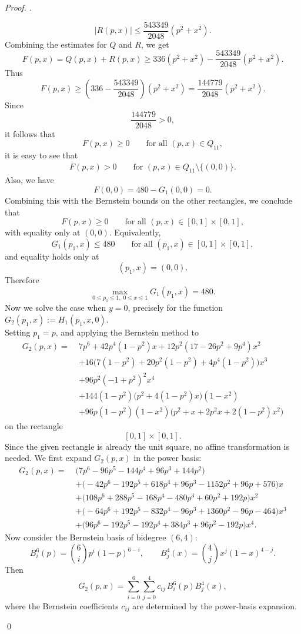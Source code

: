 \documentclass[a4paper,12pt,reqno]{amsart} %
\numberwithin{equation}{section}
\theoremstyle{definition}
\newenvironment{pf}[1][]{%
	\vskip 3mm
	\noindent
	\ifthenelse{\equal{#1}{}}%
	{{\slshape Proof. }}%
	{{\slshape #1.} }%
}%
{\qed\bigskip}
\begin{document}
\begin{pf}
\[
|R(p,x)|\le \frac{543349}{2048}(p^2+x^2).
\]
Combining the estimates for $Q$ and $R$, we get
\[
F(p,x)=Q(p,x)+R(p,x)
\ge 336(p^2+x^2)-\frac{543349}{2048}(p^2+x^2).
\]
Thus
\[
F(p,x)\ge
\left(336-\frac{543349}{2048}\right)(p^2+x^2)
=
\frac{144779}{2048}(p^2+x^2).
\]
Since
\[
\frac{144779}{2048}>0,
\]
it follows that
\[
F(p,x)\ge 0
\qquad \text{for all }(p,x)\in Q_{11},
\]
it is easy to see that
\begin{align*}
F(p,x)>0
\qquad \text{for }(p,x)\in Q_{11}\setminus\{(0,0)\}.
\end{align*}
Also, we have
\[
F(0,0)=480-G_1(0,0)=0.
\]
Combining this with the Bernstein bounds on the other rectangles, we conclude that
\[
F(p,x)\ge 0
\qquad \text{for all }(p,x)\in[0, 1]\times[0, 1],
\]
with equality only at \((0,0)\).
Equivalently,
\[
G_1(p_1,x)\le 480
\qquad \text{for all }(p_1,x)\in[0, 1]\times[0, 1],
\]
and equality holds only at
\[
(p_1,x)=(0,0).
\]
Therefore
\[
\max_{0\le p_1\le 1,\;0\le x\le 1}G_1(p_1,x)=480.
\]
Now we solve the case when 
$y=0$, precisely for the function $G_{2}(p_1, x):=H_{1}(p_1, x, 0)$.\\[2mm]
Setting $p_{1}=p$, and applying the Bernstein method to
\[
\begin{aligned}
G_2(p,x)=\;&7 p^6 + 42 p^4 (1-p^2)x + 12 p^2(17-26p^2+9p^4)x^2 \\
&+16\bigl(7(1-p^2)+20p^2(1-p^2)+4p^4(1-p^2)\bigr)x^3 \\
&+96p^2(-1+p^2)^2x^4 \\
&+144(1-p^2)\bigl(p^2+4(1-p^2)x\bigr)(1-x^2) \\
&+96p(1-p^2)(1-x^2)\bigl(p^2+x+2p^2x+2(1-p^2)x^2\bigr)
\end{aligned}
\]
on the rectangle
\[
[0,1]\times[0,1].
\]
Since the given rectangle is already the unit square, no affine transformation is needed. We first expand \(G_2(p,x)\) in the power basis:
\[
\begin{aligned}
G_2(p,x)=\;&\bigl(7p^6-96p^5-144p^4+96p^3+144p^2\bigr) \\
&+\bigl(-42p^6-192p^5+618p^4+96p^3-1152p^2+96p+576\bigr)x \\
&+\bigl(108p^6+288p^5-168p^4-480p^3+60p^2+192p\bigr)x^2 \\
&+\bigl(-64p^6+192p^5-832p^4-96p^3+1360p^2-96p-464\bigr)x^3 \\
&+\bigl(96p^6-192p^5-192p^4+384p^3+96p^2-192p\bigr)x^4.
\end{aligned}
\]
Now consider the Bernstein basis of bidegree \((6,4)\):
\[
B_i^6(p)=\binom{6}{i}p^i(1-p)^{6-i},
\qquad
B_j^4(x)=\binom{4}{j}x^j(1-x)^{4-j}.
\]
Then
\[
G_2(p,x)=\sum_{i=0}^{6}\sum_{j=0}^{4} c_{ij}\,B_i^6(p)B_j^4(x),
\]
where the Bernstein coefficients \(c_{ij}\) are determined by the power-basis expansion.


\end{pf}
\end{document}
